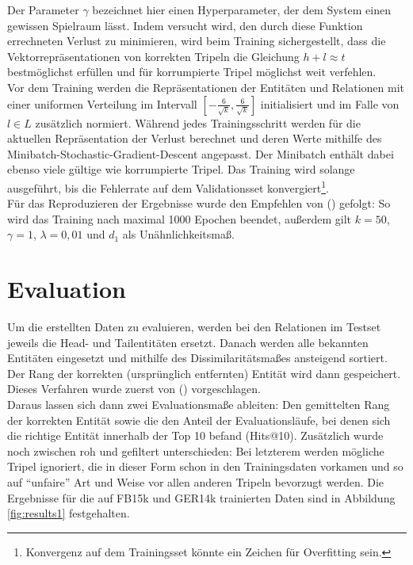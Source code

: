 Der Parameter $\gamma$ bezeichnet hier einen Hyperparameter, der dem System einen gewissen Spielraum lässt. Indem versucht
wird, den durch diese Funktion errechneten Verlust zu minimieren, wird beim Training sichergestellt, dass die Vektorrepräsentationen
von korrekten Tripeln die Gleichung $h + l \approx t$ bestmöglichst erfüllen und für korrumpierte Tripel möglichst weit
verfehlen.\\
Vor dem Training werden die Repräsentationen der Entitäten und Relationen mit einer uniformen Verteilung im Intervall
$[-\frac{6}{\sqrt{k}}, \frac{6}{\sqrt{k}}]$ initialisiert und im Falle von $l \in L$ zusätzlich normiert. Während jedes
Trainingsschritt werden für die aktuellen Repräsentation der Verlust berechnet und deren Werte mithilfe des
Minibatch-Stochastic-Gradient-Descent angepasst. Der Minibatch enthält dabei ebenso viele gültige wie korrumpierte Tripel.
Das Training wird solange ausgeführt, bis die Fehlerrate auf dem Validationsset konvergiert\footnote{Konvergenz auf dem
Trainingsset könnte ein Zeichen für Overfitting sein.}.\\

Für das Reproduzieren der Ergebnisse wurde den Empfehlen von (\cite{bordes2013translating}) gefolgt: So wird das Training
nach maximal 1000 Epochen beendet, außerdem gilt $k = 50$, $\gamma = 1$, $\lambda = 0,01$ und $d_1$ als Unähnlichkeitsmaß.

\section{Evaluation}

Um die erstellten Daten zu evaluieren, werden bei den Relationen im Testset jeweils die Head- und Tailentitäten ersetzt.
Danach werden alle bekannten Entitäten eingesetzt und mithilfe des Dissimilaritätsmaßes ansteigend sortiert. Der Rang
der korrekten (ursprünglich entfernten) Entität wird dann gespeichert. Dieses Verfahren wurde zuerst von (\cite{bordes2011learning})
vorgeschlagen.\\
Daraus lassen sich dann zwei Evaluationsmaße ableiten: Den gemittelten Rang der korrekten Entität sowie die den Anteil
der Evaluationsläufe, bei denen sich die richtige Entität innerhalb der Top 10 befand (Hits@10). Zusätzlich wurde noch
zwischen roh und gefiltert unterschieden: Bei letzterem werden mögliche Tripel ignoriert, die in dieser Form schon in
den Trainingsdaten vorkamen und so auf ``unfaire'' Art und Weise vor allen anderen Tripeln bevorzugt werden.
Die Ergebnisse für die auf FB15k und GER14k trainierten Daten sind in Abbildung \ref{fig:results1} festgehalten.


